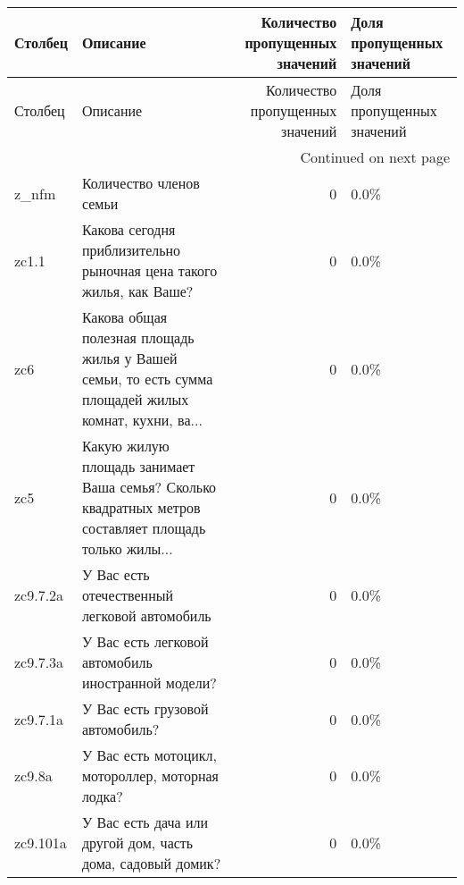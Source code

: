 \begin{longtable}{llrl}
\toprule
 Столбец &                                                                                             Описание &  Количество пропущенных значений & Доля пропущенных значений \\
\midrule
\endfirsthead

\toprule
 Столбец &                                                                                             Описание &  Количество пропущенных значений & Доля пропущенных значений \\
\midrule
\endhead
\midrule
\multicolumn{4}{r}{{Continued on next page}} \\
\midrule
\endfoot

\bottomrule
\endlastfoot
   z\_nfm &                                                                              Количество членов семьи &                                0 &                      0.0\% \\
   zc1.1 &                                  Какова сегодня приблизительно рыночная цена такого жилья, как Ваше? &                                0 &                      0.0\% \\
     zc6 & Какова общая полезная площадь жилья у Вашей семьи, то есть сумма площадей жилых комнат, кухни, ва... &                                0 &                      0.0\% \\
     zc5 & Какую жилую площадь занимает Ваша семья? Сколько квадратных метров составляет площадь только жилы... &                                0 &                      0.0\% \\
zc9.7.2a &                                                         У Вас есть отечественный легковой автомобиль &                                0 &                      0.0\% \\
zc9.7.3a &                                                  У Вас есть легковой автомобиль иностранной модели?  &                                0 &                      0.0\% \\
zc9.7.1a &                                                                      У Вас есть грузовой автомобиль? &                                0 &                      0.0\% \\
  zc9.8a &                                                     У Вас есть мотоцикл, мотороллер, моторная лодка? &                                0 &                      0.0\% \\
zc9.101a &                                           У Вас есть дача или другой дом, часть дома, садовый домик? &                                0 &                      0.0\% \\

\end{longtable}
